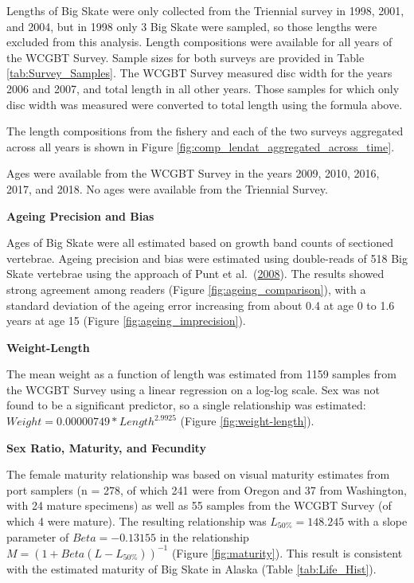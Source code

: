 \documentclass[12pt,]{article}
\begin{document}
Lengths of Big Skate were only collected from the Triennial survey in
1998, 2001, and 2004, but in 1998 only 3 Big Skate were sampled, so
those lengths were excluded from this analysis. Length compositions were
available for all years of the WCGBT Survey. Sample sizes for both
surveys are provided in Table \ref{tab:Survey_Samples}. The WCGBT Survey
measured disc width for the years 2006 and 2007, and total length in all
other years. Those samples for which only disc width was measured were
converted to total length using the formula above.

The length compositions from the fishery and each of the two surveys
aggregated across all years is shown in Figure
\ref{fig:comp_lendat_aggregated_across_time}.

Ages were available from the WCGBT Survey in the years 2009, 2010, 2016,
2017, and 2018. No ages were available from the Triennial Survey.

\vspace{.5cm}

\textbf{Ageing Precision and Bias}

Ages of Big Skate were all estimated based on growth band counts of
sectioned vertebrae. Ageing precision and bias were estimated using
double-reads of 518 Big Skate vertebrae using the approach of Punt et
al.~(\protect\hyperlink{ref-Punt2008}{2008}). The results showed strong
agreement among readers (Figure \ref{fig:ageing_comparison}), with a
standard deviation of the ageing error increasing from about 0.4 at age
0 to 1.6 years at age 15 (Figure \ref{fig:ageing_imprecision}).

\vspace{.5cm}

\textbf{Weight-Length}

The mean weight as a function of length was estimated from 1159 samples
from the WCGBT Survey using a linear regression on a log-log scale. Sex
was not found to be a significant predictor, so a single relationship
was estimated: \(Weight = 0.00000749 * Length ^ {2.9925}\) (Figure
\ref{fig:weight-length}).

\vspace{.5cm}

\textbf{Sex Ratio, Maturity, and Fecundity}

The female maturity relationship was based on visual maturity estimates
from port samplers (n = 278, of which 241 were from Oregon and 37 from
Washington, with 24 mature specimens) as well as 55 samples from the
WCGBT Survey (of which 4 were mature). The resulting relationship was
\(L_{50\%} = 148.245\) with a slope parameter of \(Beta = -0.13155\) in
the relationship \(M = (1 + Beta(L - L_{50\%}))^{-1}\) (Figure
\ref{fig:maturity}). This result is consistent with the estimated
maturity of Big Skate in Alaska (Table \ref{tab:Life_Hist}).
\end{document}
